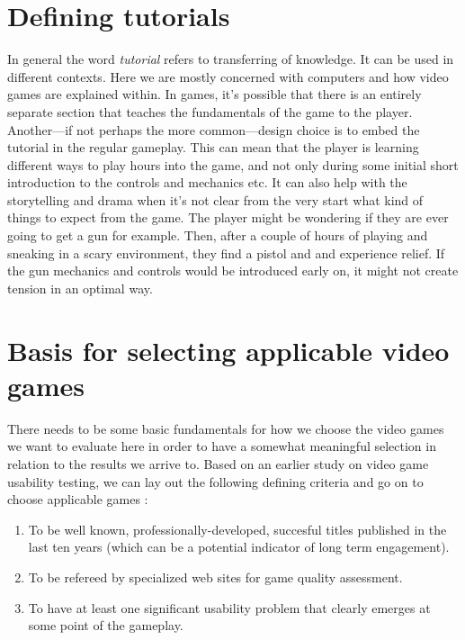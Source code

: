 \section{Defining tutorials}
In general the word \textit{tutorial} refers to transferring of knowledge. It can be used in different contexts. Here we are mostly concerned with computers and how video games are explained within. In games, it's possible that there is an entirely separate section that teaches the fundamentals of the game to the player. Another---if not perhaps the more common---design choice is to embed the tutorial in the regular gameplay. This can mean that the player is learning different ways to play hours into the game, and not only during some initial short introduction to the controls and mechanics etc. It can also help with the storytelling and drama when it's not clear from the very start what kind of things to expect from the game. The player might be wondering if they are ever going to get a gun for example. Then, after a couple of hours of playing and sneaking in a scary environment, they find a pistol and and experience relief. If the gun mechanics and controls would be introduced early on, it might not create tension in an optimal way.

\section{Basis for selecting applicable video games}
There needs to be some basic fundamentals for how we choose the video games we want to evaluate here in order to have a somewhat meaningful selection in relation to the results we arrive to. Based on an earlier study on video game usability testing, we can lay out the following defining criteria and go on to choose applicable games \cite{Febretti2009a}:
\begin{enumerate}
	\item To be well known, professionally-developed, succesful titles published in the last ten years (which can be a potential indicator of long term engagement).
	\item To be refereed by specialized web sites for game quality assessment.
	\item To have at least one significant usability problem that clearly emerges at some point of the gameplay.
\end{enumerate}
